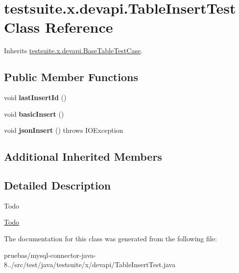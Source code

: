 \hypertarget{classtestsuite_1_1x_1_1devapi_1_1_table_insert_test}{}\section{testsuite.\+x.\+devapi.\+Table\+Insert\+Test Class Reference}
\label{classtestsuite_1_1x_1_1devapi_1_1_table_insert_test}


Inherits \mbox{\hyperlink{classtestsuite_1_1x_1_1devapi_1_1_base_table_test_case}{testsuite.\+x.\+devapi.\+Base\+Table\+Test\+Case}}.

\subsection*{Public Member Functions}
\begin{DoxyCompactItemize}
\item 
\mbox{\label{classtestsuite_1_1x_1_1devapi_1_1_table_insert_test_a2d64d9c5ab05ed9b0aee79822f4da8f1}} 
void {\bfseries last\+Insert\+Id} ()
\item 
\mbox{\label{classtestsuite_1_1x_1_1devapi_1_1_table_insert_test_a6ecbc4c48d9b0b4b1df6013c2cf30ead}} 
void {\bfseries basic\+Insert} ()
\item 
\mbox{\label{classtestsuite_1_1x_1_1devapi_1_1_table_insert_test_ae19a2dfa061c082bbd792e5ddffaf3fc}} 
void {\bfseries json\+Insert} ()  throws I\+O\+Exception 
\end{DoxyCompactItemize}
\subsection*{Additional Inherited Members}


\subsection{Detailed Description}
\begin{DoxyRefDesc}{Todo}
\item[\mbox{\hyperlink{todo__todo000009}{Todo}}]\end{DoxyRefDesc}


The documentation for this class was generated from the following file\+:\begin{DoxyCompactItemize}
\item 
pruebas/mysql-\/connector-\/java-\/8../src/test/java/testsuite/x/devapi/Table\+Insert\+Test.\+java\end{DoxyCompactItemize}

